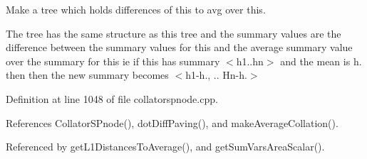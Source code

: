 \-Make a tree which holds differences of this to avg over this. 

\-The tree has the same structure as this tree and the summary values are the difference between the summary values for this and the average summary value over the summary for this ie if this has summary $<$h1..hn$>$ and the mean is h. then then the new summary becomes $<$h1-\/h., .. \-Hn-\/h.$>$ 

\-Definition at line 1048 of file collatorspnode.\-cpp.



\-References \-Collator\-S\-Pnode(), dot\-Diff\-Paving(), and make\-Average\-Collation().



\-Referenced by get\-L1\-Distances\-To\-Average(), and get\-Sum\-Vars\-Area\-Scalar().


